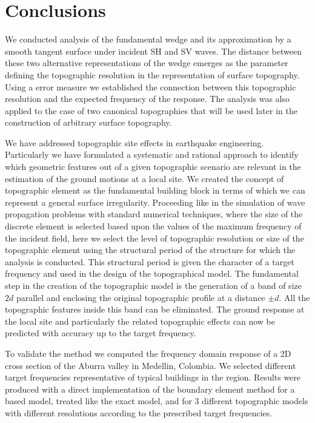 \documentclass[11pt,letterpaper]{article}
\begin{document}
\section*{Conclusions}

We conducted analysis of the fundamental wedge and its approximation by a smooth tangent surface under incident SH and SV waves. The distance between these two alternative representations of the wedge emerges as the parameter defining the topographic resolution in the representation of surface topography. Using a error measure we established the connection between this topographic resolution and the expected frequency of the response. The analysis was also applied to the case of two canonical topographies that will be used later in the construction of arbitrary surface topography.


We have addressed topographic site effects in earthquake engineering. Particularly we have formulated a systematic and rational approach to identify which geometric features out of a given topographic scenario are relevant in the estimation of the ground motions at a local site. We created the concept of topographic element as the fundamental building block in terms of which we can represent a general surface irregularity. Proceeding like in the simulation of wave propagation problems with standard numerical techniques, where the size of the discrete element is selected based upon the values of the maximum frequency of the incident field, here we select the level of topographic resolution or size of the topographic element using the structural period of the structure for which the analysis is conducted. This structural period is given the character of a target frequency and used in the design of the topographical model. The fundamental step in the creation of the topographic model is the generation of a band of size $2d$ parallel and enclosing the original topographic profile at a distance $\pm d$. All the topographic features inside this band can be eliminated. The ground response at the local site and particularly the related topographic effects can now be predicted  with accuracy up to the target frequency.

To validate the method we computed the frequency domain response of a 2D cross section of the Aburra valley in Medellin, Colombia. We selected different target frequencies representative of typical buildings in the region. Results were produced with a direct implementation of the boundary element method for a based model, treated like the exact model, and for 3 different topographic models with different resolutions according to the prescribed target frequencies.
\end{document}
